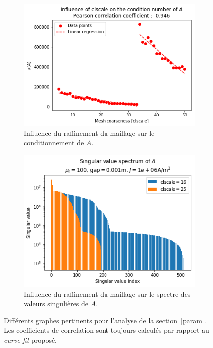 \documentclass[11pt]{article}
\begin{document}
\begin{figure}[H]
\begin{subfigure}[t]{0.24\textwidth}
		\includegraphics[width=\linewidth]{clscalecond.png}
		\caption{Influence du raffinement du maillage sur le conditionnement de $A$.}
		\label{fig:clscalecond}
	\end{subfigure}\hfill
	\begin{subfigure}[t]{0.24\textwidth}
		\centering
		\includegraphics[width=\linewidth]{clscalespec.png}
		\caption{Influence du raffinement du maillage sur le spectre des valeurs singulières de $A$.}
		\label{fig:clscalespec}
	\end{subfigure}
	\caption{Différents graphes pertinents pour l'analyse de la section~\ref{param}.
	Les coefficients de correlation sont toujours calculés par rapport au \emph{curve fit} proposé.}
	\label{fig:figsec1}
\end{figure}
\end{document}
